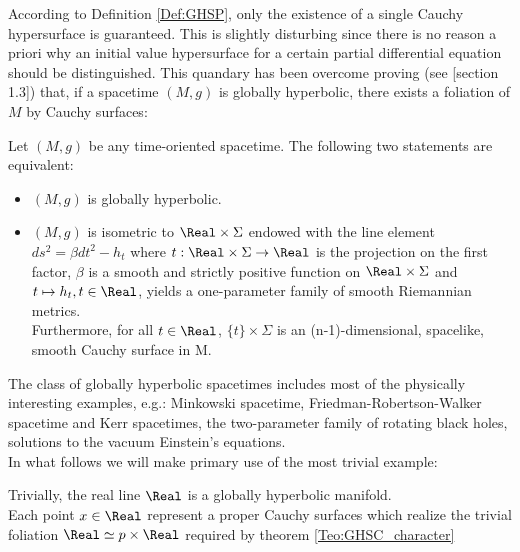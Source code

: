 \documentclass[Main]{subfiles}
\begin{document}
			According to Definition \ref{Def:GHSP}, only the existence of a single Cauchy hypersurface is guaranteed. 
			This is slightly disturbing since there is no reason a priori why an initial value hypersurface for a certain partial differential equation should be distinguished. 
			This quandary has been overcome proving (see \cite{Baer2008}[section 1.3]) that, if a spacetime $(M,g)$ is globally hyperbolic, there exists a foliation of $M$ by Cauchy surfaces:
			\begin{theorem}\label{Teo:GHSC_character}
				Let $(M,g)$ be any time-oriented spacetime. The following two statements are equivalent:
				\begin{itemize}
					\item $(M,g)$ is globally hyperbolic.
					\item $(M,g)$ is isometric to $ \Real \times \Sigma $ 
						endowed with the line element $ds^2 = \beta dt^2 - h_t$ 
						where $t : \Real \times \Sigma \rightarrow \Real$ is the projection on the first factor, 
						$\beta$ is a smooth and strictly positive function on $\Real \times \Sigma$ 
						and $t \mapsto h_t , t \in \Real$, yields a one-parameter family of smooth Riemannian metrics.\\
						Furthermore, for all $t\in \Real$, $\{t\}\times \Sigma$ is an (n-1)-dimensional, spacelike, smooth Cauchy surface in M.
				\end{itemize}
			\end{theorem}
			
			The class of globally hyperbolic spacetimes includes most of the physically interesting examples, e.g.: Minkowski spacetime, Friedman-Robertson-Walker spacetime and Kerr spacetimes, the two-parameter family of rotating black holes, solutions to the vacuum Einstein's equations. 
			\\
			In what follows we will make primary use of the most trivial example:
			\begin{example}
				Trivially, the real line $\Real$ is a globally hyperbolic manifold.
				\\
				Each point $x\in \Real$ represent a proper Cauchy surfaces which realize the trivial foliation $\Real \simeq {p}\times \Real $ required by theorem \ref{Teo:GHSC_character}
			\end{example}
\end{document}
